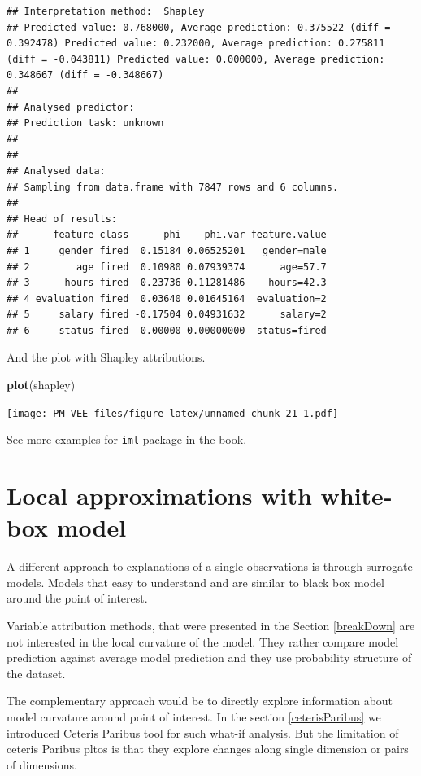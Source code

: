 \documentclass[]{krantz}
\newenvironment{Shaded}{\begin{snugshade}}{\end{snugshade}}
\newcommand{\KeywordTok}[1]{\textcolor[rgb]{0.13,0.29,0.53}{\textbf{#1}}}
\newcommand{\NormalTok}[1]{#1}
\theoremstyle{definition}
\theoremstyle{definition}
\theoremstyle{definition}
\theoremstyle{remark}
\begin{document}
\begin{verbatim}
## Interpretation method:  Shapley 
## Predicted value: 0.768000, Average prediction: 0.375522 (diff = 0.392478) Predicted value: 0.232000, Average prediction: 0.275811 (diff = -0.043811) Predicted value: 0.000000, Average prediction: 0.348667 (diff = -0.348667)
## 
## Analysed predictor: 
## Prediction task: unknown 
## 
## 
## Analysed data:
## Sampling from data.frame with 7847 rows and 6 columns.
## 
## Head of results:
##      feature class      phi    phi.var feature.value
## 1     gender fired  0.15184 0.06525201   gender=male
## 2        age fired  0.10980 0.07939374      age=57.7
## 3      hours fired  0.23736 0.11281486    hours=42.3
## 4 evaluation fired  0.03640 0.01645164  evaluation=2
## 5     salary fired -0.17504 0.04931632      salary=2
## 6     status fired  0.00000 0.00000000  status=fired
\end{verbatim}

And the plot with Shapley attributions.

\begin{Shaded}
\begin{Highlighting}[]
\KeywordTok{plot}\NormalTok{(shapley)}
\end{Highlighting}
\end{Shaded}

\texttt{[image: PM\_VEE\_files/figure-latex/unnamed-chunk-21-1.pdf]}

See more examples for \texttt{iml} package in the \citep{molnar} book.

\hypertarget{LIME}{%
\section{Local approximations with white-box model}\label{LIME}}

A different approach to explanations of a single observations is through
surrogate models. Models that easy to understand and are similar to
black box model around the point of interest.

Variable attribution methods, that were presented in the Section
\ref{breakDown} are not interested in the local curvature of the model.
They rather compare model prediction against average model prediction
and they use probability structure of the dataset.

The complementary approach would be to directly explore information
about model curvature around point of interest. In the section
\ref{ceterisParibus} we introduced Ceteris Paribus tool for such what-if
analysis. But the limitation of ceteris Paribus pltos is that they
explore changes along single dimension or pairs of dimensions.
\end{document}

